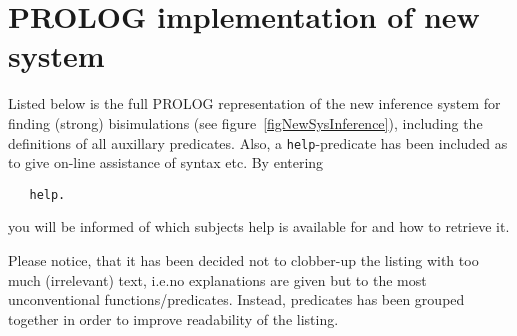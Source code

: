 \chapter[PROLOG implementation of new system]{PROLOG implementation of new system}\label{appPrologImp}

Listed below is the full PROLOG representation of the new inference system for finding (strong) bisimulations (see figure~\ref{figNewSysInference}), including the definitions of all auxillary predicates. Also, a \verb!help!-predicate has been included as to give on-line assistance of syntax etc. By entering
\begin{verbatim}
   help.
\end{verbatim}
you will be informed of which subjects help is available for and how to retrieve it.

Please notice, that it has been decided not to clobber-up the listing with too much (irrelevant) text, i.e.\@ no explanations are given but to the most unconventional functions/predicates. Instead, predicates has been grouped together in order to improve readability of the listing.

\newpage

%
